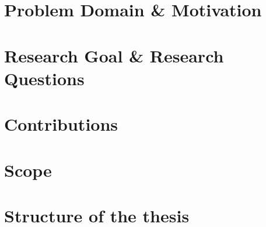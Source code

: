 \section{Problem Domain \& Motivation}



\section{Research Goal \& Research Questions}



\section{Contributions}

\section{Scope}

\section{Structure of the thesis}
